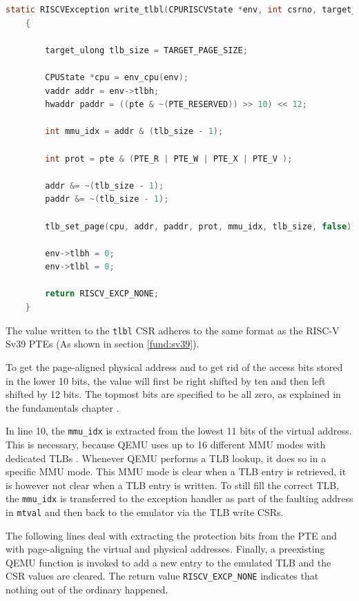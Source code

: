 \begin{lstlisting}[language=c,float=h!,
    label={lst:tlbl}]
    static RISCVException write_tlbl(CPURISCVState *env, int csrno, target_ulong pte)
    {

        target_ulong tlb_size = TARGET_PAGE_SIZE;

        CPUState *cpu = env_cpu(env);
        vaddr addr = env->tlbh;
        hwaddr paddr = ((pte & ~(PTE_RESERVED)) >> 10) << 12;

        int mmu_idx = addr & (tlb_size - 1);

        int prot = pte & (PTE_R | PTE_W | PTE_X | PTE_V );

        addr &= ~(tlb_size - 1);
        paddr &= ~(tlb_size - 1);

        tlb_set_page(cpu, addr, paddr, prot, mmu_idx, tlb_size, false);

        env->tlbh = 0;
        env->tlbl = 0;

        return RISCV_EXCP_NONE;
    }
\end{lstlisting}
The value written to the \texttt{tlbl} CSR adheres to the same format as the RISC-V Sv39 PTEs (As shown in section \ref{fund:sv39}).

To get the page-aligned physical address and to get rid of the access bits stored in the lower 10 bits,
the value will first be right shifted by ten and then left shifted by 12 bits.
The topmost bits are specified to be all zero, as explained in the fundamentals chapter \cite{RISCVInstructionSet}.

In line 10, the \texttt{mmu\_idx} is extracted from the lowest 11 bits of the virtual address. This is
necessary, because QEMU uses up to 16 different MMU modes with dedicated TLBs \cite{QEMUSource2024}.
Whenever QEMU performs a TLB lookup, it does so in a specific MMU mode. This MMU mode is clear when
a TLB entry is retrieved, it is however not clear when a TLB entry is written.
To still fill the correct TLB, the \texttt{mmu\_idx} is transferred to the exception handler as part
of the faulting address in \texttt{mtval} and then back to the emulator via the TLB write CSRs.

The following lines deal with extracting the protection bits from the PTE and with page-aligning
the virtual and physical addresses. Finally, a preexisting QEMU function is invoked to add
a new entry to the emulated TLB and the CSR values are cleared.
The return value \texttt{RISCV\_EXCP\_NONE} indicates that nothing out of the ordinary happened.

